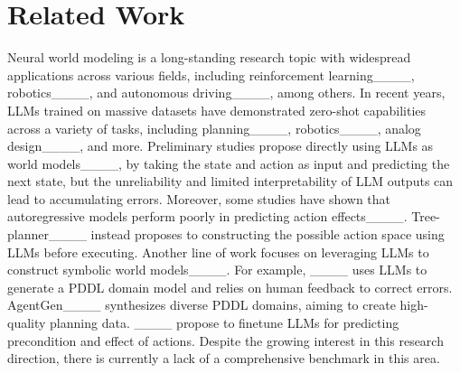 \section{Related Work}
Neural world modeling is a long-standing research topic with widespread applications across various fields, including reinforcement learning____, robotics____, and autonomous driving____, among others.
In recent years, LLMs trained on massive datasets have demonstrated zero-shot capabilities across a variety of tasks, including planning____, robotics____, analog design____, and more.
Preliminary studies propose directly using LLMs as world models____, by taking the state and action as input and predicting the next state, but the unreliability and limited interpretability of LLM outputs can lead to accumulating errors.
Moreover, some studies have shown that autoregressive models perform poorly in predicting action effects____.
Tree-planner____ instead proposes to constructing the possible action space using LLMs before executing.
Another line of work focuses on leveraging LLMs to construct symbolic world models____. 
For example, ____ uses LLMs to generate a PDDL domain model and relies on human feedback to correct errors. 
AgentGen____ synthesizes diverse PDDL domains, aiming to create high-quality planning data. 
____ propose to finetune LLMs for predicting precondition and effect of actions.
% 
Despite the growing interest in this research direction, there is currently a lack of a comprehensive benchmark in this area. 


